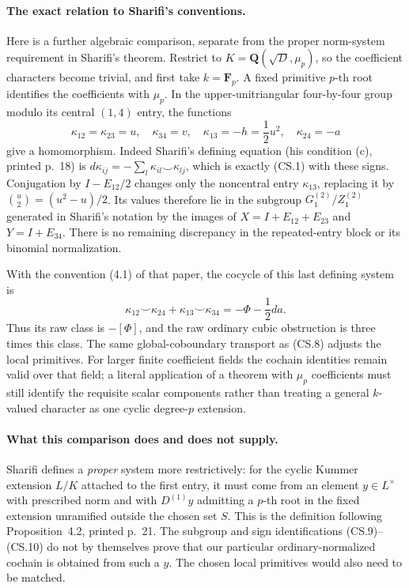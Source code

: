 \paragraph{The exact relation to Sharifi's conventions.}
Here is a further algebraic comparison, separate from the
proper norm-system requirement in Sharifi's theorem.
Restrict to \(K=\mathbf Q(\sqrt D,\mu_p)\), so the
coefficient characters become trivial, and first take
\(k=\mathbf F_p\).  A fixed primitive \(p\)-th root
identifies the coefficients with \(\mu_p\).
In the upper-unitriangular four-by-four group modulo its
central \((1,4)\) entry, the functions
\[
 \kappa_{12}=\kappa_{23}=u,\quad\kappa_{34}=v,\quad
 \kappa_{13}=-h=\frac12u^2,\quad\kappa_{24}=-a
                                                               \tag{CS.9}
\]
give a homomorphism.  Indeed Sharifi's defining equation
(his condition (c), printed p.~18) is
\(d\kappa_{ij}=-\sum_l\kappa_{il}\smile\kappa_{lj}\),
which is exactly (CS.1) with these signs.
Conjugation by \(I-E_{12}/2\) changes only the noncentral
entry \(\kappa_{13}\), replacing it by
\(\binom{u}{2}=(u^2-u)/2\).  Its values therefore lie
in the subgroup \(G_1^{(2)}/Z_1^{(2)}\) generated in
Sharifi's notation by the images of
\(X=I+E_{12}+E_{23}\) and \(Y=I+E_{34}\).
There is no remaining discrepancy in the repeated-entry
block or its binomial normalization.

With the convention (4.1) of that paper, the cocycle
of this last defining system is
\[
 \kappa_{12}\smile\kappa_{24}
       +\kappa_{13}\smile\kappa_{34}
       =-\Phi-\frac12d a .                              \tag{CS.10}
\]
Thus its raw class is \(-[\Phi]\), and the raw ordinary
cubic obstruction is three times this class.  The same
global-coboundary transport as (CS.8) adjusts the local
primitives.  For larger finite coefficient fields the
cochain identities remain valid over that field; a
literal application of a theorem with \(\mu_p\)
coefficients must still identify the requisite scalar
components rather than treating a general \(k\)-valued
character as one cyclic degree-\(p\) extension.

\paragraph{What this comparison does and does not supply.}
Sharifi defines a \emph{proper} system more restrictively:
for the cyclic Kummer extension \(L/K\) attached to the
first entry, it must come from an element \(y\in L^\times\)
with prescribed norm and with \(D^{(1)}y\) admitting a
\(p\)-th root in the fixed extension unramified outside
the chosen set \(S\).  This is the definition following
Proposition~4.2, printed p.~21.  The subgroup and sign
identifications (CS.9)--(CS.10) do not by themselves
prove that our particular ordinary-normalized cochain
is obtained from such a \(y\).  The chosen local
primitives would also need to be matched.

